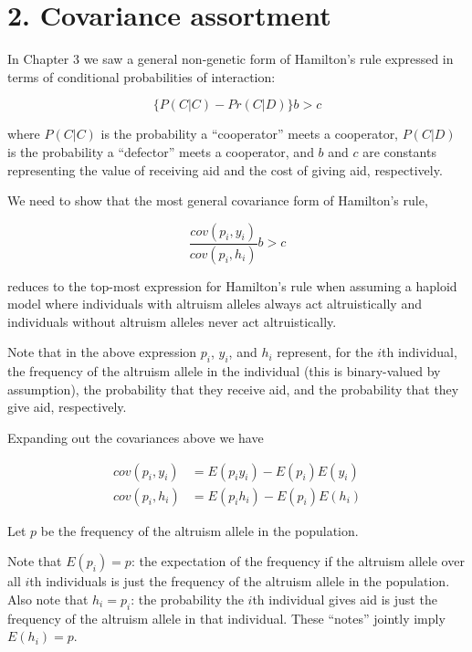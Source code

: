 \documentclass{article}
\begin{document}
\section*{2. Covariance assortment}

In Chapter 3 we saw a general non-genetic form of Hamilton's rule
expressed in terms of conditional probabilities of interaction:

\begin{equation*}
    \{P(C|C) - Pr(C|D)\} b > c
\end{equation*}

where $P(C|C)$ is the probability a ``cooperator'' meets a cooperator,
$P(C|D)$ is the probability a ``defector'' meets a cooperator, and $b$
and $c$ are constants representing the value of receiving aid and the
cost of giving aid, respectively.

We need to show that the most general covariance form of Hamilton's rule,

\begin{equation*}
    \frac{cov(p_i, y_i)}{cov(p_i, h_i)} b > c
\end{equation*}

reduces to the top-most expression for Hamilton's rule when assuming a
haploid model where individuals with altruism alleles always act
altruistically and individuals without altruism alleles never act
altruistically.

Note that in the above expression $p_i$, $y_i$, and $h_i$ represent, for
the $i$th individual, the frequency of the altruism allele in the
individual (this is binary-valued by assumption), the probability that
they receive aid, and the probability that they give aid, respectively.

Expanding out the covariances above we have

\begin{align*}
    cov(p_i, y_i) &= E(p_i y_i) - E(p_i) E(y_i) \\
    cov(p_i, h_i) &= E(p_i h_i) - E(p_i) E(h_i)
\end{align*}

Let $p$ be the frequency of the altruism allele in the population.

Note that $E(p_i) = p$: the expectation of the frequency if the altruism
allele over all $i$th individuals is just the frequency of the altruism
allele in the population. Also note that $h_i = p_i$: the probability
the $i$th individual gives aid is just the frequency of the altruism
allele in that individual. These ``notes'' jointly imply $E(h_i) = p$.
\end{document}
